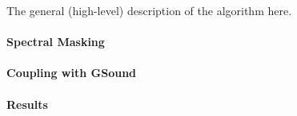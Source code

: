 The general (high-level) description of the algorithm here.


\paragraph{Spectral Masking}


\paragraph{Coupling with GSound}


\paragraph{Results}